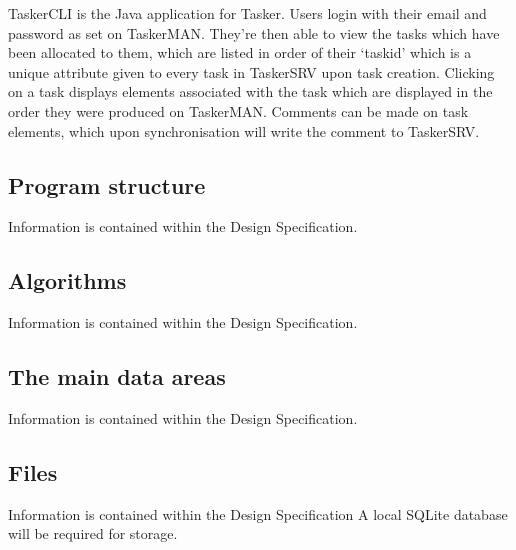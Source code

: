 \documentclass{project}
\begin{document}
TaskerCLI is the Java application for Tasker. Users login with their email and password as set on TaskerMAN. They're then able to view the tasks which have been allocated to them, which are listed in order of their `taskid' which is a unique attribute given to every task in TaskerSRV upon task creation. Clicking on a task displays elements associated with the task which are displayed in the order they were produced on TaskerMAN. Comments can be made on task elements, which upon synchronisation will write the comment to TaskerSRV.
\subsection{Program structure}
Information is contained within the Design Specification\cite{se.qa.ds}.

\subsection{Algorithms}
Information is contained within the Design Specification\cite{se.qa.ds}.

\subsection{The main data areas}
Information is contained within the Design Specification\cite{se.qa.ds}.

\subsection{Files}
Information is contained within the Design Specification\cite{se.qa.ds} A local SQLite database will be required for storage.
\end{document}
